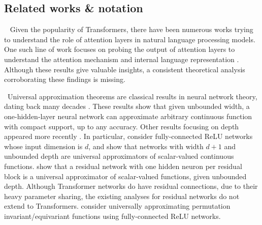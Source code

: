 \documentclass{article} %
\begin{document}
\subsection{Related works \& notation}
\vspace*{-3pt}
~%
Given the popularity of Transformers, there have been numerous works trying to understand the role of attention layers in natural language processing models. One such line of work focuses on probing the output of attention layers to understand the attention mechanism and internal language representation \citep{hewitt2019structural, clark2019does, coenen2019visualizing, vig2019analyzing}. Although these results give valuable insights, a consistent theoretical analysis corroborating these findings is missing. %

~Universal approximation theorems are classical results in neural network theory, dating back many decades \citep{cybenko1989approximation, hornik1991approximation}. These results show that given unbounded width, a one-hidden-layer neural network can approximate arbitrary continuous function with compact support, up to any accuracy. 
Other results focusing on depth appeared more recently \citep{lu2017expressive, hanin2017approximating, lin2018resnet}. In particular, \citet{lu2017expressive, hanin2017approximating} consider fully-connected ReLU networks whose input dimension is $d$, and show that networks with width $d+1$ and unbounded depth are universal approximators of scalar-valued continuous functions. \citet{lin2018resnet} show that a residual network with one hidden neuron per residual block is a universal approximator of scalar-valued functions, given unbounded depth.
Although Transformer networks do have residual connections, due to their heavy parameter sharing, the existing analyses for residual networks do not extend to Transformers.
\citet{sannai2019universal} consider universally approximating permutation invariant/equivariant functions using fully-connected ReLU networks.
\end{document}
